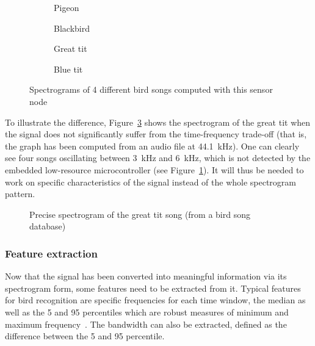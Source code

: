 \documentclass{EPL-master-thesis-covers-EN}
\begin{document}
\begin{figure}[H]
\begin{subfigure}{.49\textwidth}
  \centering
  
  \caption{Pigeon}
\end{subfigure}
\begin{subfigure}{.49\textwidth}
  \centering
  
  \caption{Blackbird}
\end{subfigure}
\newline
\begin{subfigure}{.49\textwidth}
  \centering
  
  \caption{Great tit}
  \label{fig:great_tit}
\end{subfigure}
\begin{subfigure}{.49\textwidth}
  \centering
  
  \caption{Blue tit}
\end{subfigure}
\caption{Spectrograms of 4 different bird songs computed with this sensor node}
\label{fig:4birds}
\end{figure}

To illustrate the difference, Figure~\ref{fig:greattit_full} shows the spectrogram of the great tit when the signal does not significantly suffer from the time-frequency trade-off (that is, the graph has been computed from an audio file at \SI{44.1}{kHz}). One can clearly see four songs oscillating between \SI{3}{kHz} and \SI{6}{kHz}, which is not detected by the embedded low-resource microcontroller (see Figure~\ref{fig:great_tit}). It will thus be needed to work on specific characteristics of the signal instead of the whole spectrogram pattern.

\begin{figure}[H]
    \centering
    
    \caption{Precise spectrogram of the great tit song (from a bird song database)}
    \label{fig:greattit_full}
\end{figure}

\subsubsection*{Feature extraction}

Now that the signal has been converted into meaningful information via its spectrogram form, some features need to be extracted from it. Typical features for bird recognition are specific frequencies for each time window, the median as well as the 5 and 95 percentiles which are robust measures of minimum and maximum frequency~\cite{Stowell}. The bandwidth can also be extracted, defined as the difference between the 5 and 95 percentile. 
\end{document}

